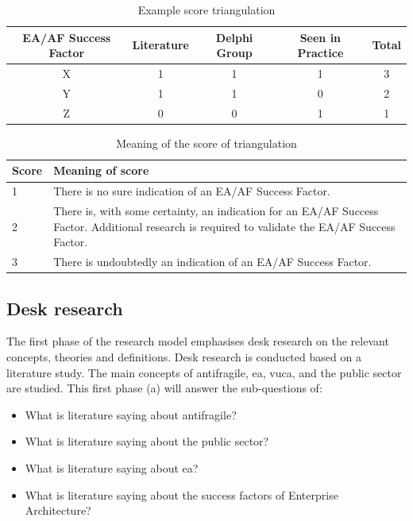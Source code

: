\begin{table}[!h]
	\begin{center}
		\begin{tabular}{@{}ccccc@{}}
			\toprule
			EA/AF Success Factor & Literature & Delphi Group & Seen in Practice & Total \\ \midrule
			X    & 1    & 1   & 1   & 3   \\
			Y    & 1    & 1  & 0   & 2   \\
			Z    & 0    & 0   & 1   & 1   \\ \bottomrule
		\end{tabular}
		\caption{Example score triangulation}
		\label{tab:exampletriangulation}
	\end{center}
\end{table}

\begin{table}[!h]
	\begin{center}
		\begin{tabular}{p{}p{}}
			\toprule
			Score 	& Meaning of score \\ \midrule
			1		& There is no sure indication of an EA/AF Success Factor. \\
			2    	& There is, with some certainty, an indication for an EA/AF Success Factor. Additional research is required to validate the EA/AF Success Factor. \\
			3    	& There is undoubtedly an indication of an EA/AF Success Factor. \\ \bottomrule
		\end{tabular}
		\caption{Meaning of the score of triangulation}
		\label{tab:exampletriangulationscoring}
	\end{center}
\end{table}




\subsection{Desk research}
\label{sub:deskresearchphase}
The first phase of the research model emphasises desk research on the relevant concepts, theories and definitions. Desk research is conducted based on a literature study. The main concepts of \gls{antifragile}, \acrshort{ea}, \acrshort{vuca}, and the public sector are studied. This first phase (a) will answer the sub-questions of:
\begin{itemize}
	\item{What is literature saying about \gls{antifragile}?}
	\item{What is literature saying about the public sector?}
	\item{What is literature saying about \acrlong{ea}?}
	\item{What is literature saying about the success factors of Enterprise Architecture?}
\end{itemize}

